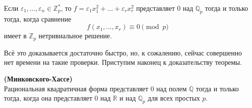 \documentclass[11pt]{report}
\begin{document}
    \begin{corollary}\label{MincCor}
        Если $\varepsilon_1, \ldots, \varepsilon_n \in \mathbb{Z}_p^{*}$, то $f = \varepsilon_1 x_1^2 + \ldots + \varepsilon_r x_r^2 $ представляет
        0 над $\mathbb{Q}_p$ тогда и только тогда, когда сравнение
        \[ f(x_1, \ldots, x_r) \equiv 0 \pmod{p} \]
        имеет в $\mathbb{Z}_p$ нетривиальное решение.
     \end{corollary}
    Всё это доказывается достаточно быстро, но, к сожалению, сейчас совершенно нет времени на такие проверки.
    Приступим наконец к доказательству теоремы.
    \begin{theorem} \textbf{(Минковского-Хассе)}\\
        Рациональная квадратичная форма представляет 0 над полем $\mathbb{Q}$ тогда и только тогда, когда она представляет 0 над $\mathbb{R}$
        и над $\mathbb{Q}_p$ для всех простых $p$.
    \end{theorem}
\end{document}
